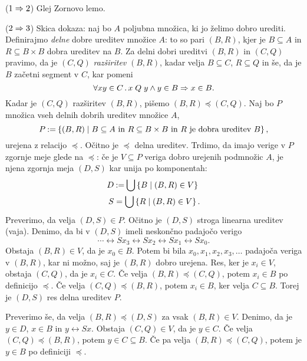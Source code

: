 \begin{dokaz}
  ($1 \Rightarrow 2$) Glej Zornovo lemo.

  ($2 \Rightarrow 3$) Skica dokaza: naj bo $A$ poljubna množica, ki jo želimo dobro urediti.
  Definirajmo \emph{delne} dobre ureditev množice $A$: to so pari $(B,R)$, kjer je $B \subseteq A$
  in $R \subseteq B \times B$ dobra ureditev na $B$. Za delni dobri ureditvi $(B,R)$ in
  $(C,Q)$ pravimo, da je $(C,Q)$ \emph{razširitev} $(B,R)$, kadar velja $B \subseteq C$, $R \subseteq Q$ in
  še, da je $B$ začetni segment v $C$, kar pomeni
  \begin{equation*}
    \forall x y \in C \,.\, x \mathrel{Q} y \land y \in B \Rightarrow x \in B.
  \end{equation*}
  Kadar je $(C,Q)$ razširitev $(B,R)$, pišemo $(B,R) \preceq (C,Q)$. Naj bo $P$ množica vseh delnih
  dobrih ureditev množice $A$,
  \begin{equation*}
    P \mathbin{{:}{=}} \left\{ (B, R) \mid \text{$B \subseteq A$ in $R \subseteq B \times B$ in $R$ je dobra ureditev $B$}\right\},
  \end{equation*}
  urejena z relacijo $\preceq$. Očitno je $\preceq$ delna ureditev. Trdimo, da imajo verige v
  $P$ zgornje meje glede na $\preceq$: če je $V \subseteq P$ veriga dobro urejenih podmnožic
  $A$, je njena zgornja meja $(D,S)$ kar unija po komponentah:
  \begin{align*}
    D &\mathbin{{:}{=}} \bigcup \left\{B \mid (B, R) \in V\right\} \\
    S &= \bigcup \left\{R \mid (B, R) \in V\right\}.
  \end{align*}
  Preverimo, da velja $(D,S) \in P$. Očitno je $(D,S)$ stroga linearna ureditev
  (vaja). Denimo, da bi v $(D,S)$ imeli neskončno padajočo verigo
  \begin{equation*}
    \cdots \rel{S} x_3 \rel{S} x_2 \rel{S} x_1 \rel{S} x_0.
  \end{equation*}
  Obstaja $(B,R) \in V$, da je $x_0 \in B$. Potem bi bila $x_0, x_1, x_2, x_3, \ldots$
  padajoča veriga v $(B,R)$, kar ni možno, saj je $(B,R)$ dobro urejena. Res, ker
  je $x_i \in V$, obstaja $(C,Q)$, da je $x_i \in C$. Če velja $(B,R) \preceq (C,Q)$, potem
  $x_i \in B$ po definicijo $\preceq$. Če velja $(C,Q) \preceq (B,R)$, potem $x_i \in B$, ker velja
  $C \subseteq B$. Torej je $(D,S)$ res delna ureditev $P$.

  Preverimo še, da velja $(B,R) \preceq (D,S)$ za vsak $(B,R) \in V$. Denimo, da je $y \in D$,
  $x \in B$ in $y \rel{S} x$. Obstaja $(C,Q) \in V$, da je $y \in C$. Če velja $(C,Q) \preceq (B,R)$,
  potem $y \in C \subseteq B$. Če pa velja $(B,R) \preceq (C,Q)$, potem je $y \in B$ po definiciji $\preceq$.


\end{dokaz}
